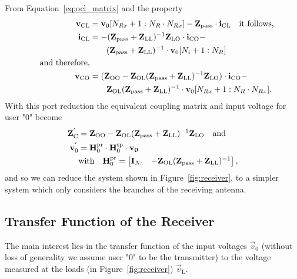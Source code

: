 From Equation~\eqref{eq:ocl_matrix} and the property
\begin{align}
\mathbf{v}_\text{CL} &= \mathbf{v}_0[N_{Rx}+1:N_R\cdot N_{Rx}]-\mathbf{Z}_{\text{pass}}\cdot\mathbf{i}_\text{CL}\quad\text{it follows,}\\
\mathbf{i}_\text{CL} &= -(\mathbf{Z}_{\text{pass}} + \mathbf{Z}_\text{LL})^{-1}\mathbf{Z}_\text{LO}\cdot\mathbf{i}_\text{CO} -\\\nonumber
&\qquad (\mathbf{Z}_{\text{pass}} + \mathbf{Z}_\text{LL})^{-1}\cdot\mathbf{v}_{0}[N_i+1:N_R]\\\nonumber\quad\text{and therefore,}&\\
\mathbf{v}_\text{CO} &= (\mathbf{Z}_\text{OO}-\mathbf{Z}_\text{OL}(\mathbf{Z}_{\text{pass}} + \mathbf{Z}_\text{LL})^{-1}\mathbf{Z}_\text{LO})\cdot\mathbf{i}_\text{CO} -\\\nonumber&\qquad \mathbf{Z}_\text{OL}(\mathbf{Z}_{\text{pass}} + \mathbf{Z}_\text{LL})^{-1}\cdot\mathbf{v}_0[N_{Rx}+1:N_R\cdot N_{Rx}].
\end{align}
With this port reduction the equivalent coupling matrix and input voltage for user "0" become
\begin{align}
\label{eq:port_reduction}
\mathbf{Z}_\text{C}^{'}&= \mathbf{Z}_\text{OO} - \mathbf{Z}_\text{OL}(\mathbf{Z}_{\text{pass}} + \mathbf{Z}_\text{LL})^{-1}\mathbf{Z}_\text{LO}\quad\text{and}\\
\mathbf{v}_0^{'} &= \mathbf{H}_0^{\text{pr}} \cdot\mathbf{H}_{0}^{\text{sp}}\cdot \mathbf{v_0}\\\nonumber
&\text{with}\quad\mathbf{H}_0^{\text{pr}}=
\begin{bmatrix}
\mathbf{I}_{N_i} & -\mathbf{Z}_\text{OL}(\mathbf{Z}_{\text{pass}} + \mathbf{Z}_\text{LL})^{-1}
\end{bmatrix},
\end{align}
and so we can reduce the system shown in Figure~\ref{fig:receiver}, to a simpler system which only considers the branches of the receiving antenna.











\subsection{Transfer Function of the Receiver}
\label{sec:transf}
The main interest lies in the transfer function of the input voltages $\vec{v}_0$ (without loss of generality we assume user "0" to be the transmitter) to the voltage measured at the loads (in Figure~\ref{fig:receiver}) $\vec{v}_\text{L}$.


